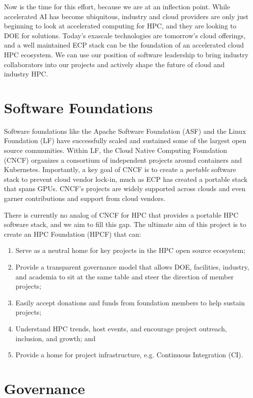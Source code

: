 \documentclass[11pt]{article}
\begin{document}
Now is the time for this effort, because we are at an inflection point. While
accelerated AI has become ubiquitous, industry and cloud providers are only just
beginning to look at accelerated computing for HPC, and they are looking to DOE for
solutions. Today's exascale technologies are tomorrow's cloud offerings, and a well
maintained ECP stack can be the foundation of an accelerated cloud HPC ecosystem. We can
use our position of software leadership to bring industry collaborators into our
projects and actively shape the future of cloud and industry HPC.

\section{Software Foundations}

Software foundations like the Apache Software Foundation (ASF) and the Linux Foundation
(LF) have successfully scaled and sustained some of the largest open source communities.
Within LF, the Cloud Native Computing Foundation (CNCF) organizes a consortium of
independent projects around containers and Kubernetes. Importantly, a key goal of CNCF
is to create a {\it portable} software stack to prevent cloud vendor lock-in, much as
ECP has created a portable stack that spans GPUs. CNCF's projects are widely supported
across clouds and even garner contributions and support from cloud vendors.

There is currently no analog of CNCF for HPC that provides a portable HPC software
stack, and we aim to fill this gap. The ultimate aim of this project is to create an HPC
Foundation (HPCF) that can:
\begin{enumerate}
\item Serve as a neutral home for key projects in the HPC open source ecosystem;
\item Provide a transparent governance model that allows DOE, facilities, industry, and
  academia to sit at the same table and steer the direction of member projects;
\item Easily accept donations and funds from foundation members to help sustain projects;
\item Understand HPC trends, host events, and encourage project outreach, inclusion, and
  growth; and
\item Provide a home for project infrastructure, e.g. Continuous Integration (CI).
\end{enumerate}

\section{Governance}
\end{document}
